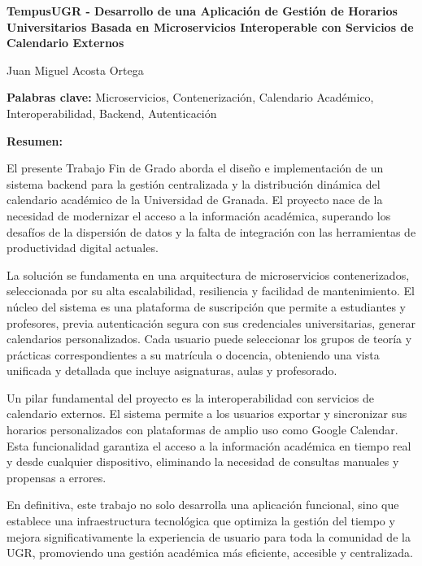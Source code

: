 \newpage
\begin{center}
    {\large \textbf{TempusUGR - Desarrollo de una Aplicación de Gestión de Horarios Universitarios Basada en Microservicios Interoperable con Servicios de Calendario Externos}}
    
    \vspace{0.3cm}
    {\normalsize Juan Miguel Acosta Ortega} 
    
    \vspace{0.3cm}
\end{center}

\vspace{0.5cm}

\textbf{Palabras clave:} Microservicios, Contenerización, Calendario Académico, Interoperabilidad, Backend, Autenticación

\vspace{0.5cm}

\textbf{Resumen:}

El presente Trabajo Fin de Grado aborda el diseño e implementación de un sistema backend para la gestión centralizada y la distribución dinámica del calendario académico de la Universidad de Granada. El proyecto nace de la necesidad de modernizar el acceso a la información académica, superando los desafíos de la dispersión de datos y la falta de integración con las herramientas de productividad digital actuales.

La solución se fundamenta en una arquitectura de microservicios contenerizados, seleccionada por su alta escalabilidad, resiliencia y facilidad de mantenimiento. El núcleo del sistema es una plataforma de suscripción que permite a estudiantes y profesores, previa autenticación segura con sus credenciales universitarias, generar calendarios personalizados. Cada usuario puede seleccionar los grupos de teoría y prácticas correspondientes a su matrícula o docencia, obteniendo una vista unificada y detallada que incluye asignaturas, aulas y profesorado.

Un pilar fundamental del proyecto es la interoperabilidad con servicios de calendario externos. El sistema permite a los usuarios exportar y sincronizar sus horarios personalizados con plataformas de amplio uso como Google Calendar. Esta funcionalidad garantiza el acceso a la información académica en tiempo real y desde cualquier dispositivo, eliminando la necesidad de consultas manuales y propensas a errores.

En definitiva, este trabajo no solo desarrolla una aplicación funcional, sino que establece una infraestructura tecnológica que optimiza la gestión del tiempo y mejora significativamente la experiencia de usuario para toda la comunidad de la UGR, promoviendo una gestión académica más eficiente, accesible y centralizada.
